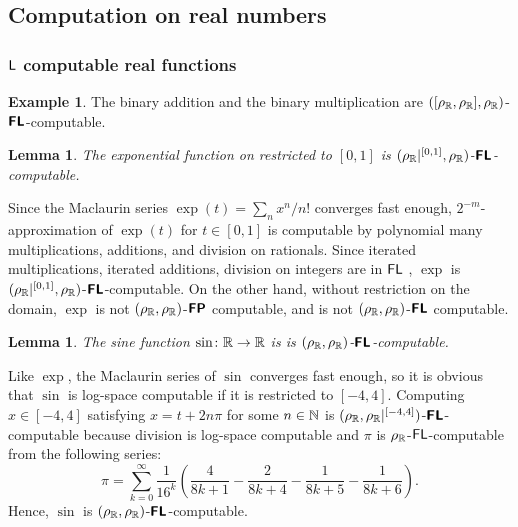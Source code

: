 \documentclass{article}
\newtheorem{lemma}[theorem]{Lemma}
\theoremstyle{definition}
\newtheorem{example}[theorem]{Example}
\theoremstyle{remark}
\begin{document}
\subsection{Computation on real numbers}
\label{section:function}

\subsubsection{\texorpdfstring{$\mathsf{L}$}{L} computable real functions}

\begin{example}
 The binary addition and the binary multiplication are
 $([\rho _\mathbb R, \rho _\mathbb R], \rho _\mathbb R)$-$\text{\bfseries \sffamily \upshape FL}$-computable.
\end{example}

\begin{lemma}
 The exponential function on restricted to $[0,1]$
 is $(\rho _\mathbb R|^{[0,1]}, \rho _\mathbb R)$-$\text{\bfseries \sffamily \upshape FL}$-computable.
\end{lemma}
Since the Maclaurin series $\exp(t) = \sum_n x^n / n!$ converges fast enough,
$2^{-m}$-approximation of $\exp(t)$ for $t \in [0,1]$ is computable 
by polynomial many multiplications, additions, and division on rationals.
Since iterated multiplications, iterated additions, division on integers
are in $\mathsf{FL}$ \cite{chiu2001division},
$\exp$ is $(\rho _\mathbb R|^{[0,1]}, \rho _\mathbb R)$-$\text{\bfseries \sffamily \upshape FL}$-computable.
On the other hand, without restriction on the domain, $\exp$ is not 
$(\rho _\mathbb R, \rho _\mathbb R)$-$\text{\bfseries \sffamily \upshape FP}$ computable, 
and is not $(\rho _\mathbb R, \rho _\mathbb R)$-$\text{\bfseries \sffamily \upshape FL}$ computable.



\begin{lemma}
  The sine function $\sin \colon \mathbb R \to \mathbb R$ is
 is $(\rho _\mathbb R, \rho _\mathbb R)$-$\text{\bfseries \sffamily \upshape FL}$-computable.
\end{lemma}
Like $\exp$, the Maclaurin series of $\sin$ converges fast enough,
so it is obvious that $\sin$ is log-space computable if it is restricted to $[-4, 4]$.
Computing $x \in [-4, 4]$ satisfying $x = t + 2n\pi$ for some $n \in \mathbb N$ is
$(\rho _\mathbb R, \rho _\mathbb R|^{[-4,4]})$-$\text{\bfseries \sffamily \upshape FL}$-computable because division is log-space computable and $\pi$ is $\rho _\mathbb R$-$\mathsf{FL}$-computable from the following series:
\begin{equation}
 \pi = \sum_{k=0}^\infty \frac{1}{16^k} 
  \left( \frac{4}{8k+1} - \frac{2}{8k+4} - \frac{1}{8k+5} - \frac{1}{8k+6} \right).
\end{equation}
Hence, $\sin$ is $(\rho _\mathbb R, \rho _\mathbb R)$-$\text{\bfseries \sffamily \upshape FL}$-computable.
\end{document}
